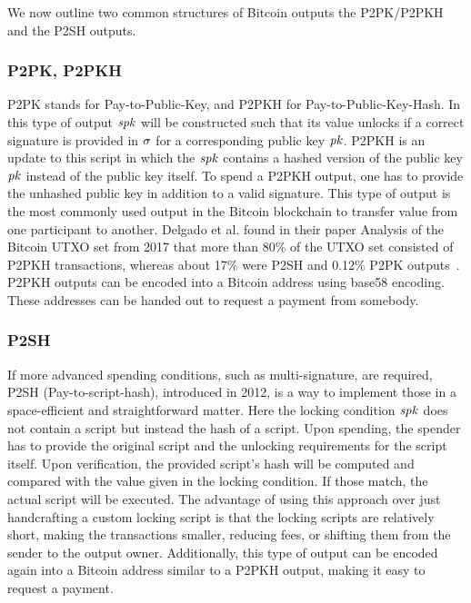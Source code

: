 We now outline two common structures of Bitcoin outputs the P2PK/P2PKH and the P2SH outputs.

\subsubsection{P2PK, P2PKH\label{sec:pre:bitcoin:p2pk}}

P2PK stands for Pay-to-Public-Key, and P2PKH for Pay-to-Public-Key-Hash.
In this type of output $\mathit{spk}$ will be constructed such that its value unlocks if a correct signature is provided in $\mathit{\sigma}$ for a corresponding public key $\mathit{pk}$.
P2PKH is an update to this script in which the $\mathit{spk}$ contains a hashed version of the public key $\mathit{pk}$ instead of the public key itself.
To spend a P2PKH output, one has to provide the unhashed public key in addition to a valid signature.
This type of output is the most commonly used output in the Bitcoin blockchain to transfer value from one participant to another.
Delgado et al. found in their paper Analysis of the Bitcoin UTXO set from 2017 that more than 80\% of the UTXO set consisted of P2PKH transactions, whereas about 17\% were P2SH and 0.12\% P2PK outputs~\cite{delgado2018analysis}.
P2PKH outputs can be encoded into a Bitcoin address using base58 encoding.
These addresses can be handed out to request a payment from somebody.

\subsubsection{P2SH} \label{sec:pre:bitcoin:p2sh}

If more advanced spending conditions, such as multi-signature, are required, P2SH (Pay-to-script-hash), introduced in 2012, is a way to implement those in a space-efficient and straightforward matter.
Here the locking condition $\mathit{spk}$ does not contain a script but instead the hash of a script.
Upon spending, the spender has to provide the original script and the unlocking requirements for the script itself.
Upon verification, the provided script's hash will be computed and compared with the value given in the locking condition.
If those match, the actual script will be executed.
The advantage of using this approach over just handcrafting a custom locking script is that the locking scripts are relatively short, making the transactions smaller, reducing fees, or shifting them from the sender to the output owner.
Additionally, this type of output can be encoded again into a Bitcoin address similar to a P2PKH output, making it easy to request a payment.
